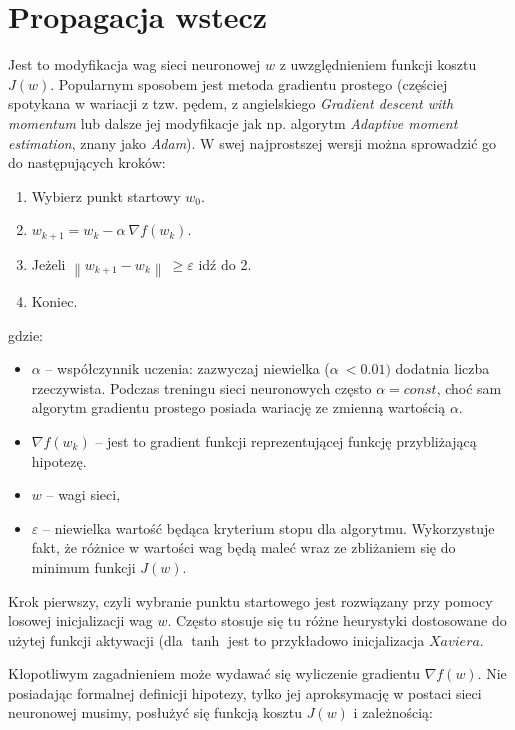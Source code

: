 \section{Propagacja wstecz}

Jest to modyfikacja wag sieci neuronowej \(w\) z uwzględnieniem funkcji kosztu \(J(w)\). Popularnym sposobem jest metoda gradientu prostego (częściej spotykana w wariacji z tzw. pędem, z angielskiego \textit{Gradient descent with momentum} lub dalsze jej modyfikacje jak np. algorytm
\textit{Adaptive moment estimation}, znany jako \textit{Adam}). W swej najprostszej wersji można sprowadzić go do następujących kroków:

\begin{enumerate}
\def\labelenumi{\arabic{enumi}.}
\item
  Wybierz punkt startowy \(w_{0}\).
\item
  \(w_{k + 1} = w_{k} - \alpha\ \nabla f(w_{k})\).
\item
  Jeżeli \(\left\| w_{k + 1} - w_{k} \right\|\  \geq \varepsilon\) idź
  do 2.
\item
  Koniec.
\end{enumerate}

gdzie:

\begin{itemize}
\item
  \(\alpha\) -- współczynnik uczenia: zazwyczaj niewielka
  (\(\alpha\  < 0.01)\) dodatnia liczba rzeczywista. Podczas treningu
  sieci neuronowych często \(\alpha = const\), choć sam algorytm
  gradientu prostego posiada wariację ze zmienną wartością \(\alpha\).
\item
  \(\nabla f(w_{k})\) -- jest to gradient funkcji reprezentującej
  funkcję przybliżającą hipotezę.
\item
  \(w\) -- wagi sieci,
\item
  \(\varepsilon\) -- niewielka wartość będąca kryterium stopu dla
  algorytmu. Wykorzystuje fakt, że różnice w wartości wag będą maleć
  wraz ze zbliżaniem się do minimum funkcji \(J(w)\).
\end{itemize}

Krok pierwszy, czyli wybranie punktu startowego jest rozwiązany przy pomocy losowej inicjalizacji wag \(w\). Często stosuje się tu różne heurystyki dostosowane do użytej funkcji aktywacji (dla \(\tanh\) jest to przykładowo inicjalizacja \(Xaviera\).

Kłopotliwym zagadnieniem może wydawać się wyliczenie gradientu \(\nabla f(w)\). Nie posiadając formalnej definicji hipotezy, tylko jej aproksymację w postaci sieci neuronowej musimy, posłużyć się funkcją kosztu \(J(w)\) i zależnością:

